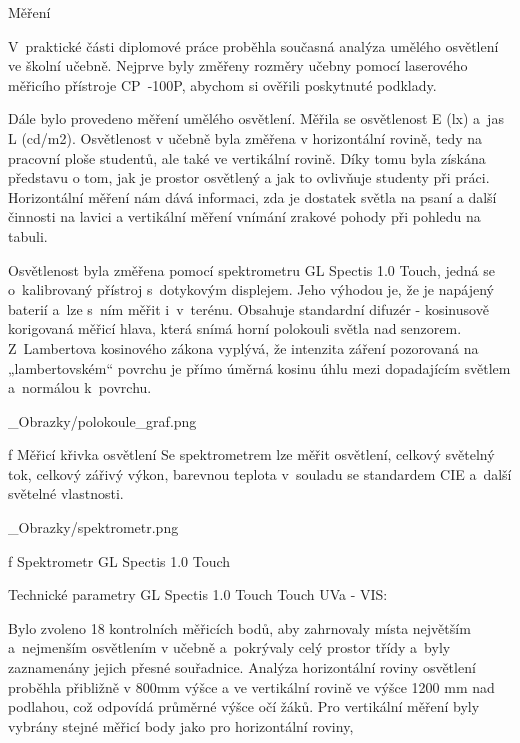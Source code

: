 \chap Měření

V~praktické části diplomové práce proběhla současná analýza umělého osvětlení ve školní učebně.
Nejprve byly změřeny rozměry učebny pomocí laserového měřicího přístroje {\sbf CP~-100P},
abychom si ověřili poskytnuté podklady.

Dále bylo provedeno měření umělého osvětlení. Měřila se osvětlenost E (lx) a~jas L (cd/m2).
Osvětlenost v učebně byla změřena v horizontální rovině, tedy na pracovní ploše studentů,
ale také ve vertikální rovině. Díky tomu byla získána představu o tom, jak je prostor osvětlený
a jak to ovlivňuje studenty při práci.
Horizontální měření nám dává informaci, zda je dostatek světla na
psaní a další činnosti na lavici a vertikální měření vnímání zrakové pohody při pohledu na tabuli.

Osvětlenost byla změřena pomocí spektrometru {\sbf GL Spectis 1.0 Touch}, jedná se o~kalibrovaný přístroj
s~dotykovým displejem. Jeho výhodou je, že je napájený baterií a~lze s~ním měřit i~v~terénu. Obsahuje standardní
difuzér - kosinusově korigovaná měřicí hlava, která snímá horní polokouli světla nad senzorem. Z~Lambertova
kosinového zákona vyplývá, že intenzita záření pozorovaná na „lambertovském“ povrchu je přímo úměrná kosinu
úhlu mezi dopadajícím světlem a~normálou k~povrchu.

\medskip {}
\picw=8cm _Obrazky/polokoule_graf.png
\caption/f Měřicí křivka osvětlení
\medskip
Se spektrometrem lze měřit osvětlení, celkový světelný tok, celkový zářivý výkon, barevnou teplota v~souladu
se standardem CIE a~další světelné vlastnosti.

\medskip {}
\picw=5cm _Obrazky/spektrometr.png
\caption/f Spektrometr GL Spectis 1.0 Touch
\medskip

\medskip
{\sbf Technické parametry GL Spectis 1.0 Touch Touch UVa - VIS:}
\medskip
{}

Bylo zvoleno 18 kontrolních měřicích bodů, aby zahrnovaly místa  největším a~nejmenším osvětlením v učebně a~pokrývaly celý prostor třídy
a~byly zaznamenány jejich přesné souřadnice. Analýza horizontální roviny osvětlení proběhla přibližně v 800mm výšce a ve vertikální
rovině ve výšce 1200 mm nad podlahou, což odpovídá průměrné výšce očí žáků. Pro vertikální měření byly vybrány stejné měřicí body jako pro horizontální roviny,

